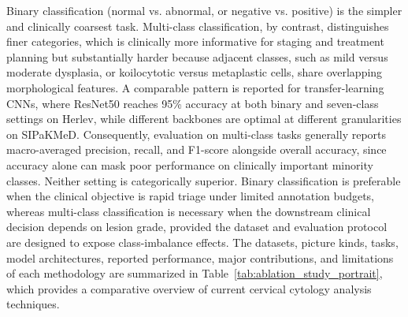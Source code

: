 \documentclass[pdflatex,sn-nature]{sn-jnl}%
\theoremstyle{thmstyleone}%
\theoremstyle{thmstyletwo}%
\theoremstyle{thmstylethree}%
\begin{document}
Binary classification (normal vs. abnormal, or negative vs. positive) is the simpler and clinically coarsest task. Multi-class classification, by contrast, distinguishes finer categories, which is clinically more informative for staging and treatment planning but substantially harder because adjacent classes,  such as mild versus moderate dysplasia, or koilocytotic versus metaplastic cells, share overlapping morphological features. A comparable pattern is reported for transfer-learning CNNs, where ResNet50 reaches 95\% accuracy at both binary and seven-class settings on Herlev, while different backbones are optimal at different granularities on SIPaKMeD\cite{Lite40}. Consequently, evaluation on multi-class tasks generally reports macro-averaged precision, recall, and F1-score alongside overall accuracy, since accuracy alone can mask poor performance on clinically important minority classes. Neither setting is categorically superior. Binary classification is preferable when the clinical objective is rapid triage under limited annotation budgets, whereas multi-class classification is necessary when the downstream clinical decision depends on lesion grade, provided the dataset and evaluation protocol are designed to expose class-imbalance effects. The datasets, picture kinds, tasks, model architectures, reported performance, major contributions, and limitations of each methodology are summarized in Table~\ref{tab:ablation_study_portrait}, which provides a comparative overview of current cervical cytology analysis techniques.
\end{document}
